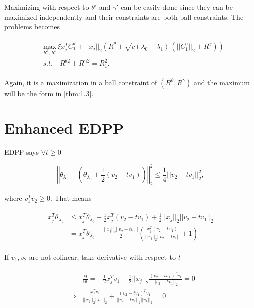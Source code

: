 Maximizing with respect to $\theta'$ and $\gamma'$ can be easily done since they can be maximized independently and their constraints are both ball constraints. The problems becomes

\begin{gather}
    \begin{aligned}
        &\underset{R^\theta,R^\gamma}{\mathrm{max}}\,\xi x_j^TC_1^\theta+||x_j||_2\left(R^\theta+\sqrt{c(\lambda_0-\lambda_1)}(||C_1^\gamma||_2+R^\gamma)\right)\\
        &s.t.\quad R^{\theta2}+R^{\gamma2}=R_1^2.
    \end{aligned}
\end{gather}

Again, it is a maximization in a ball constraint of $(R^\theta,R^\gamma)$ and the maximum will be the form in \ref{thm:1.3}. 

\section{Enhanced EDPP}

EDPP says $\forall t\geq 0$

\begin{equation}
    \left\Vert\theta_{\lambda_1}-\left(\theta_{\lambda_0}+\frac{1}{2}(v_2-tv_1)\right)\right\Vert_2^2\leq\frac{1}{4}||v_2-tv_1||_2^2,
\end{equation}

where $v_1^Tv_2\geq0$. That means

\begin{gather}
    \begin{aligned}
        x_j^T\theta_{\lambda_1}&\leq x_j^T\theta_{\lambda_0}+\frac{1}{2}x_j^T(v_2-tv_1)+\frac{1}{2}||x_j||_2||v_2-tv_1||_2\\
        &=x_j^T\theta_{\lambda_0}+\frac{||x_j||_2||v_2-tv_1||}{2}\left(\frac{x_j^T(v_2-tv_1)}{||x_j||_2||v_2-tv_1||}+1\right)
    \end{aligned}
\end{gather}

If $v_1,v_2$ are not colinear, take derivative with respect to $t$

\begin{gather}
    \label{eq:edppdt}
    \begin{aligned}
        &\frac{\partial}{\partial t}=-\frac{1}{2}x_j^Tv_1-\frac{1}{2}||x_j||_2\frac{(v_2-tv_1)^Tv_1}{||v_2-tv_1||_2}=0\\
        \implies & \frac{x_j^Tv_1}{||x_j||_2||v_1||_2}+\frac{(v_2-tv_1)^Tv_1}{||v_2-tv_1||_2||v_1||_2}=0
    \end{aligned}
\end{gather}

